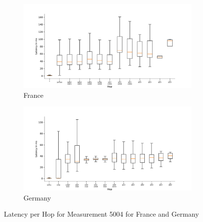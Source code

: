 \begin{figure}
	\centering
	\begin{subfigure}[b]{\linewidth}
		\includegraphics[width=\linewidth]{chapters/4-results/traceroute/img/latency-per-hop-FR-5004.pdf}
		\caption{France}
	\end{subfigure}
	\begin{subfigure}[b]{\linewidth}
		\includegraphics[width=\linewidth]{chapters/4-results/traceroute/img/latency-per-hop-DE-5004.pdf}
		\caption{Germany}
	\end{subfigure}
	\caption{Latency per Hop for Measurement 5004 for France and Germany}
	\label{fig:latency-change-per-hop-appendix-2}
\end{figure}



